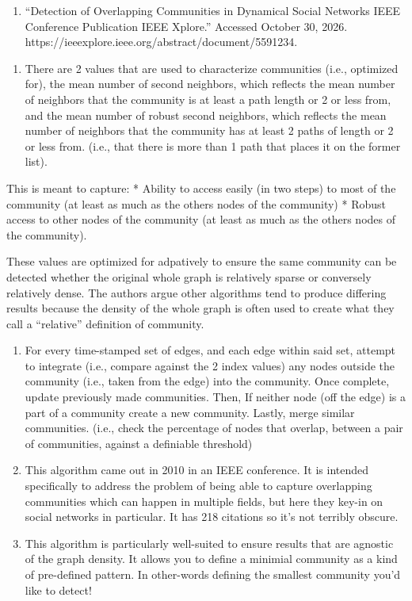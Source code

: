 \documentclass[11pt]{article}
\providecommand{\tightlist}{%
      \setlength{\itemsep}{0pt}\setlength{\parskip}{0pt}}
\begin{document}
\begin{enumerate}
\def\labelenumi{\arabic{enumi}.}
\tightlist
\item
  ``Detection of Overlapping Communities in Dynamical Social Networks
  \textbar{} IEEE Conference Publication \textbar{} IEEE Xplore.''
  Accessed October 30, 2026.
  https://ieeexplore.ieee.org/abstract/document/5591234.
\end{enumerate}

\begin{enumerate}
\def\labelenumi{(\alph{enumi})}
\tightlist
\item
  There are 2 values that are used to characterize communities (i.e.,
  optimized for), the mean number of second neighbors, which reflects
  the mean number of neighbors that the community is at least a path
  length or 2 or less from, and the mean number of robust second
  neighbors, which reflects the mean number of neighbors that the
  community has at least 2 paths of length or 2 or less from. (i.e.,
  that there is more than 1 path that places it on the former list).
\end{enumerate}

This is meant to capture: 
* Ability to access easily (in two steps) to
most of the community (at least as much as the others nodes of the
community) 
* Robust access to other nodes of the community (at least as
much as the others nodes of the community).

These values are optimized for adpatively to ensure the same community
can be detected whether the original whole graph is relatively sparse or
conversely relatively dense. The authors argue other algorithms tend to
produce differing results because the density of the whole graph is
often used to create what they call a ``relative'' definition of
community.

\begin{enumerate}
\def\labelenumi{(\alph{enumi})}
\setcounter{enumi}{1}
\item
  For every time-stamped set of edges, and each edge within said set,
  attempt to integrate (i.e., compare against the 2 index values) any
  nodes outside the community (i.e., taken from the edge) into the
  community. Once complete, update previously made communities. Then, If
  neither node (off the edge) is a part of a community create a new
  community. Lastly, merge similar communities. (i.e., check the
  percentage of nodes that overlap, between a pair of communities,
  against a definiable threshold)
\item
  This algorithm came out in 2010 in an IEEE conference. It is intended
  specifically to address the problem of being able to capture
  overlapping communities which can happen in multiple fields, but here
  they key-in on social networks in particular. It has 218 citations so
  it's not terribly obscure.
\item
  This algorithm is particularly well-suited to ensure results that are
  agnostic of the graph density. It allows you to define a minimial
  community as a kind of pre-defined pattern. In other-words defining
  the smallest community you'd like to detect!
\end{enumerate}
\end{document}
